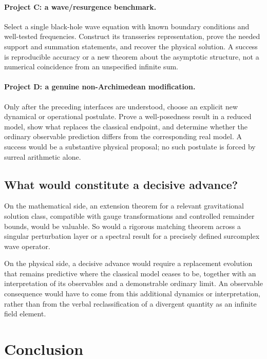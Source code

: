 \documentclass[11pt,letterpaper]{article}
\theoremstyle{definition}
\theoremstyle{remark}
\begin{document}
\paragraph{Project C: a wave/resurgence benchmark.}
Select a single black-hole wave equation with known boundary conditions and
well-tested frequencies. Construct its transseries representation, prove the
needed support and summation statements, and recover the physical solution.
A success is reproducible accuracy or a new theorem about the asymptotic
structure, not a numerical coincidence from an unspecified infinite sum.

\paragraph{Project D: a genuine non-Archimedean modification.}
Only after the preceding interfaces are understood, choose an explicit new
dynamical or operational postulate. Prove a well-posedness result in a reduced
model, show what replaces the classical endpoint, and determine whether the
ordinary observable prediction differs from the corresponding real model.
A success would be a substantive physical proposal; no such postulate is
forced by surreal arithmetic alone.

\subsection{What would constitute a decisive advance?}

On the mathematical side, an extension theorem for a relevant gravitational
solution class, compatible with gauge transformations and controlled remainder
bounds, would be valuable. So would a rigorous matching theorem across a
singular perturbation layer or a spectral result for a precisely defined
surcomplex wave operator.

On the physical side, a decisive advance would require a replacement evolution
that remains predictive where the classical model ceases to be, together with
an interpretation of its observables and a demonstrable ordinary limit.
An observable consequence would have to come from this additional dynamics or
interpretation, rather than from the verbal reclassification of a divergent
quantity as an infinite field element.

\section{Conclusion}
\label{sec:conclusion}
\end{document}
